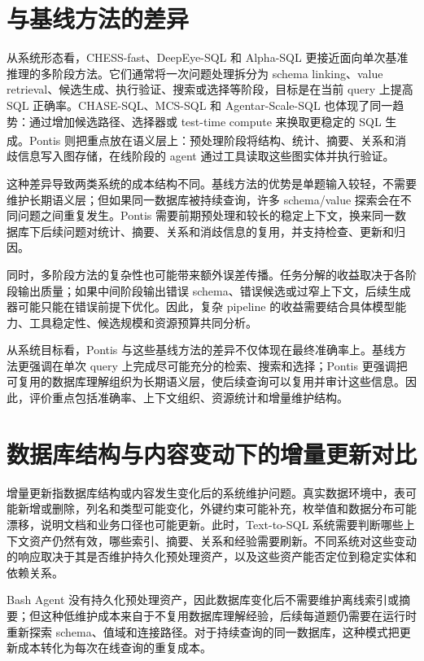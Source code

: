\documentclass[
    bachelor,
    pdflinks,
]{xjtuthesis}
\newcommand{\upcite}[1]{\textsuperscript{\cite{#1}}}
\begin{document}
\section{与基线方法的差异}

从系统形态看，CHESS-fast、DeepEye-SQL 和 Alpha-SQL 更接近面向单次基准推理的多阶段方法。它们通常将一次问题处理拆分为 schema linking、value retrieval、候选生成、执行验证、搜索或选择等阶段，目标是在当前 query 上提高 SQL 正确率。CHASE-SQL、MCS-SQL 和 Agentar-Scale-SQL 也体现了同一趋势：通过增加候选路径、选择器或 test-time compute 来换取更稳定的 SQL 生成\upcite{pourreza2024chasesql,lee2024mcssql,wang2025agentarScaleSQL}。Pontis 则把重点放在语义层上：预处理阶段将结构、统计、摘要、关系和消歧信息写入图存储，在线阶段的 agent 通过工具读取这些图实体并执行验证。

这种差异导致两类系统的成本结构不同。基线方法的优势是单题输入较轻，不需要维护长期语义层；但如果同一数据库被持续查询，许多 schema/value 探索会在不同问题之间重复发生。Pontis 需要前期预处理和较长的稳定上下文，换来同一数据库下后续问题对统计、摘要、关系和消歧信息的复用，并支持检查、更新和归因。

同时，多阶段方法的复杂性也可能带来额外误差传播。任务分解的收益取决于各阶段输出质量；如果中间阶段输出错误 schema、错误候选或过窄上下文，后续生成器可能只能在错误前提下优化。因此，复杂 pipeline 的收益需要结合具体模型能力、工具稳定性、候选规模和资源预算共同分析。

从系统目标看，Pontis 与这些基线方法的差异不仅体现在最终准确率上。基线方法更强调在单次 query 上完成尽可能充分的检索、搜索和选择；Pontis 更强调把可复用的数据库理解组织为长期语义层，使后续查询可以复用并审计这些信息。因此，评价重点包括准确率、上下文组织、资源统计和增量维护结构。

\section{数据库结构与内容变动下的增量更新对比}

增量更新指数据库结构或内容发生变化后的系统维护问题。真实数据环境中，表可能新增或删除，列名和类型可能变化，外键约束可能补充，枚举值和数据分布可能漂移，说明文档和业务口径也可能更新。此时，Text-to-SQL 系统需要判断哪些上下文资产仍然有效，哪些索引、摘要、关系和经验需要刷新。不同系统对这些变动的响应取决于其是否维护持久化预处理资产，以及这些资产能否定位到稳定实体和依赖关系。

Bash Agent 没有持久化预处理资产，因此数据库变化后不需要维护离线索引或摘要；但这种低维护成本来自于不复用数据库理解经验，后续每道题仍需要在运行时重新探索 schema、值域和连接路径。对于持续查询的同一数据库，这种模式把更新成本转化为每次在线查询的重复成本。
\end{document}
